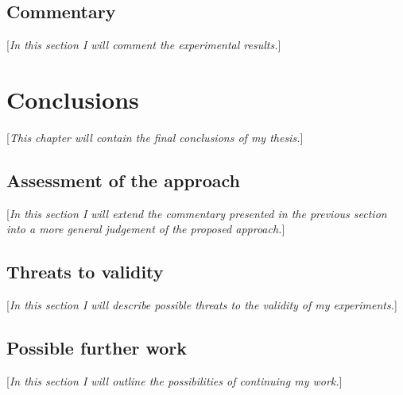 \documentclass{pracamgr}
\begin{document}
\section{Commentary}
\label{sec:commentary}
[\textit{In this section I will comment the experimental results.}]

\chapter{Conclusions}
\label{cha:conclusions}
[\textit{This chapter will contain the final conclusions of my thesis.}]

\section{Assessment of the approach}
\label{sec:assessment}
[\textit{In this section I will extend the commentary presented in the previous section into a more general judgement of the proposed approach.}]

\section{Threats to validity}
\label{sec:threats}
[\textit{In this section I will describe possible threats to the validity of my experiments.}]

\section{Possible further work}
\label{sec:further_work}
[\textit{In this section I will outline the possibilities of continuing my work.}]

\printbibliography[heading=bibintoc]
\end{document}
